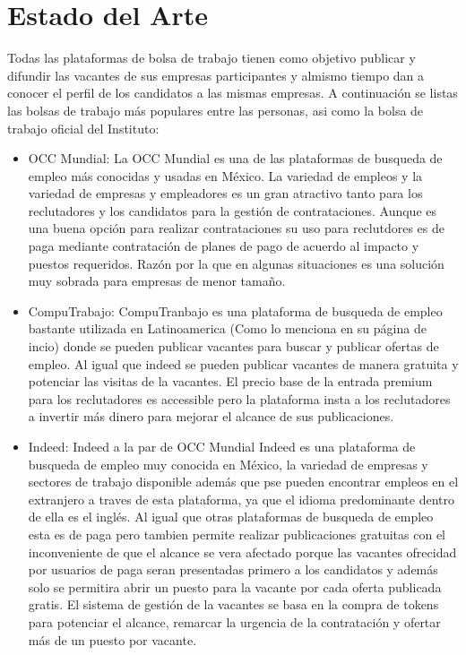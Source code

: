 \section{Estado del Arte}
Todas las plataformas de bolsa de trabajo tienen como objetivo publicar y difundir las vacantes de sus empresas participantes
y almismo tiempo dan a conocer el perfil de los candidatos a las mismas empresas.
\newline
A continuación se listas las bolsas de trabajo más populares entre las personas, asi como  la bolsa de trabajo
oficial del Instituto:
\begin{itemize}
    \item OCC Mundial:
    La OCC Mundial es una de las plataformas de busqueda de empleo más conocidas y usadas en México. La variedad de empleos y la variedad de empresas y empleadores es un gran atractivo tanto para los reclutadores y los candidatos para la gestión de contrataciones. Aunque es una buena opción para realizar contrataciones su uso para reclutdores es de paga mediante contratación de planes de pago de acuerdo al impacto y puestos requeridos. Razón por la que en algunas situaciones es una solución muy sobrada para empresas de menor tamaño.
    
    \item CompuTrabajo:
    CompuTranbajo es una plataforma de busqueda de empleo bastante utilizada en Latinoamerica (Como lo menciona en su página de incio) donde se pueden publicar vacantes para buscar y publicar ofertas de empleo. Al igual que indeed se pueden publicar vacantes de manera gratuita y potenciar las visitas de la vacantes. El precio base de la entrada premium para los reclutadores es accessible pero la plataforma insta a los reclutadores a invertir más dinero para mejorar el alcance de sus publicaciones.
    
    \item Indeed:
    Indeed a la par de OCC Mundial Indeed es una plataforma de busqueda de empleo muy conocida en México, la variedad de empresas y sectores de trabajo disponible además que pse pueden encontrar empleos en el extranjero a traves de esta plataforma, ya que el idioma predominante dentro de ella es el inglés. Al igual que otras plataformas de busqueda de empleo esta es de paga pero tambien permite realizar publicaciones gratuitas con el inconveniente de que el alcance se vera afectado porque las vacantes ofrecidad por usuarios de paga seran presentadas primero a los candidatos y además solo se permitira abrir un puesto para la vacante por cada oferta publicada gratis. El sistema de gestión de la vacantes se basa en la compra de tokens para potenciar el alcance, remarcar la urgencia de la contratación y ofertar más de un puesto por vacante.
    

\end{itemize}

